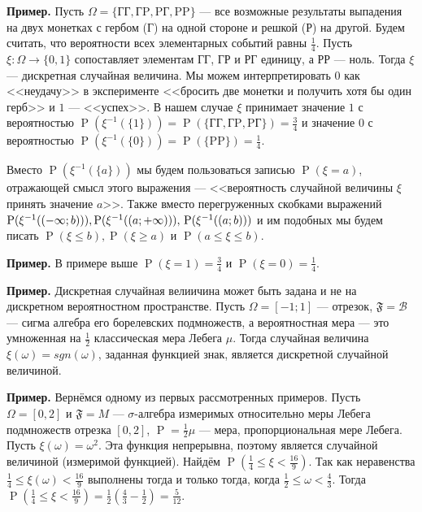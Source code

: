 \documentclass[12pt]{article}
\numberwithin{theorem}{section}
\theoremstyle{definition}
\newenvironment{example}{\indent \textbf{Пример.}}{\indent}
\newcommand{\calB}{\mathcal{B}}
\newcommand{\prob}{\operatorname{P}}
\newcommand{\events}{\mathfrak{F}}
\begin{document}
	\begin{example}
		Пусть $ \Omega = \{\text{ГГ}, \text{ГP}, \text{PГ}, \text{PP}\} $
		--- все возможные результаты выпадения на двух монетках с гербом (Г) на одной стороне и решкой (Р) на другой.
		Будем считать, что вероятности всех элементарных событий равны $ \tfrac{1}{4} $.
		Пусть $ \xi \colon \Omega \to \{0, 1\} $ сопоставляет элементам ГГ, ГР и РГ единицу, а РР --- ноль.
		Тогда $ \xi $ --- дискретная случайная величина.
		Мы можем интерпретировать $ 0 $ как <<неудачу>> в эксперименте <<бросить две монетки и получить хотя бы один герб>> 
		и $ 1 $ --- <<успех>>. 
		В нашем случае $ \xi $ принимает значение $ 1 $ с вероятностью 
		$ \prob(\xi^{-1}(\{1\})) = \prob(\{\text{ГГ}, \text{ГP}, \text{PГ}\}) = \tfrac{3}{4} $ 
		и значение $ 0 $ с вероятностью $ \prob(\xi^{-1}(\{0\})) = \prob(\{\text{PP}\}) = \tfrac{1}{4} $.		
	\end{example}
	
	Вместо $ \prob(\xi^{-1}(\{a\})) $ мы будем пользоваться записью $ \prob(\xi = a) $, отражающей смысл этого выражения
	--- <<вероятность случайной величины $ \xi $ принять значение $ a $>>.
	Также вместо перегруженных скобками выражений 
	$ \prob(\xi^{-1}((-\infty; b))), \prob(\xi^{-1}((a; +\infty))), \\ \prob(\xi^{-1}((a; b))) $ 
	и им подобных мы будем писать $ \prob(\xi \leqslant b), \prob(\xi \geqslant a) $ и 
	$ \prob(a \leqslant \xi \leqslant b) $.
	
	\begin{example}
		В примере выше $ \prob(\xi = 1) = \tfrac{3}{4} $ и $ \prob(\xi = 0) = \tfrac{1}{4} $.
	\end{example}
	
	\begin{example}
		Дискретная случайная велиичина может быть задана и не на дискретном вероятностном пространстве.
		Пусть $ \Omega = [-1;1] $ --- отрезок, $ \events = \calB $ --- сигма алгебра его борелевских подмножеств,
		а вероятностная мера --- это умноженная на $ \tfrac{1}{2} $ классическая мера Лебега $ \mu $.
		Тогда случайная величина $ \xi(\omega) = sgn(\omega) $, заданная функцией знак, 
		является дискретной случайной величиной.
	\end{example}
	
	\begin{example}
		Вернёмся одному из первых рассмотренных примеров. Пусть $ \Omega = [0, 2] $ и $ \events = M $ --- $ \sigma $-алгебра измеримых относительно меры Лебега
		подмножеств отрезка $ [0, 2] $, $ \prob = \tfrac{1}{2}\mu $ --- мера, пропорциональная мере Лебега.
		Пусть $ \xi(\omega) = \omega^2 $. Эта функция непрерывна, поэтому является случайной величиной (измеримой функцией).
		Найдём $ \prob(\tfrac{1}{4} \leqslant \xi < \tfrac{16}{9}) $.
		Так как неравенства $ \tfrac{1}{4} \leqslant \xi(\omega) < \tfrac{16}{9} $ выполнены тогда и только тогда, когда
		$ \tfrac{1}{2} \leqslant \omega < \tfrac{4}{3} $. Тогда $ \prob(\tfrac{1}{4} \leqslant \xi < \tfrac{16}{9}) = \tfrac{1}{2}(\tfrac{4}{3} - \tfrac{1}{2}) = \tfrac{5}{12} $.
	\end{example}
	
\end{document}
